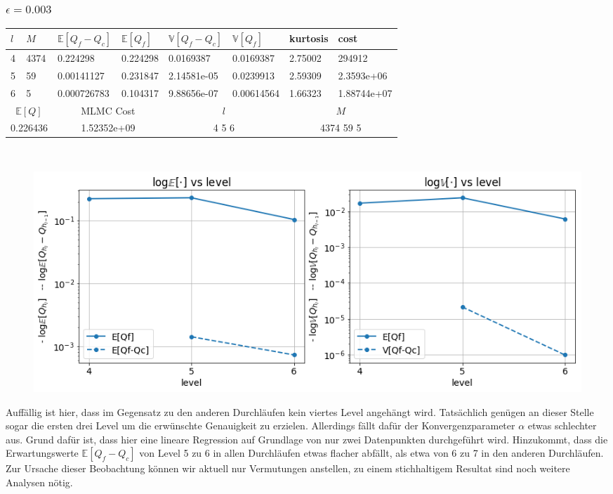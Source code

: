\subsubsection{$ \epsilon=0.003 $}
\noindent\begin{tabular}{|p{0.15\q}|p{0.55\q}|p{1.4\q}|p{1.05\q}|p{1.35\q}|p{1.25\q}|p{0.9\q}|p{1.35\q}|}
	\hline
	$ l $   &  $ M $  &  $ \mathbb{E}[Q_f-Q_c] $  &   $ \mathbb{E}[Q_f] $ &  $ \mathbb{V}[Q_f-Q_c] $   &   $ \mathbb{V}[Q_f] $ &  kurtosis    &    cost\\
	\hline
	4 & 4374&    0.224298 &   0.224298&   0.0169387 &  0.0169387  &   2.75002 &     294912 \\
	5  &  59 & 0.00141127  &  0.231847 & 2.14581e-05 &  0.0239913  &   2.59309 & 2.3593e+06\\
	6   &  5  &0.000726783  &  0.104317 & 9.88656e-07 & 0.00614564  &   1.66323 &1.88744e+07\\
	\hline
	\multicolumn{2}{|c|}{$ \mathbb{E}[Q] $ }  &  \multicolumn{2}{c|}{MLMC Cost}   & \multicolumn{2}{c|}{$ l $}  &    \multicolumn{2}{c|}{$ M$} \\
	\hline
	\multicolumn{2}{|c|}{0.226436} & \multicolumn{2}{c|}{1.52352e+09  } &  \multicolumn{2}{c|}{   4 5 6 }     & \multicolumn{2}{c|}{4374 59 5}    \\
	\hline 
\end{tabular}\\
\begin{figure}[H]
	\centering
	\includegraphics[width=\textwidth]{plots/eps003.png} 
\end{figure}
Auffällig ist hier, dass im Gegensatz zu den anderen Durchläufen kein viertes Level angehängt wird. Tatsächlich genügen an dieser Stelle sogar die ersten drei Level um die erwünschte Genauigkeit zu erzielen. Allerdings fällt dafür der Konvergenzparameter $ \alpha $ etwas schlechter aus. Grund dafür ist, dass hier eine lineare Regression auf Grundlage von nur zwei Datenpunkten durchgeführt wird. Hinzukommt, dass die Erwartungswerte $ \mathbb{E}[Q_f-Q_c] $ von Level 5 zu 6 in allen Durchläufen etwas flacher abfällt, als etwa von 6 zu 7 in den anderen Durchläufen. Zur Ursache dieser Beobachtung können wir aktuell nur Vermutungen anstellen, zu einem stichhaltigem Resultat sind noch weitere Analysen nötig.
